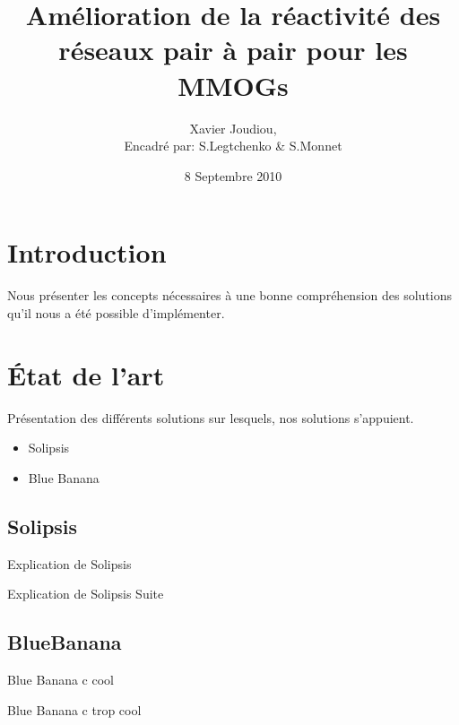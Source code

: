 \documentclass{beamer}
\title{Amélioration de la réactivité des réseaux pair à pair pour les MMOGs}
\author{Xavier Joudiou,\\\tiny{Encadré par: S.Legtchenko \& S.Monnet}}\institute{Université Paris VI, Master SAR}
\date{8 Septembre 2010}
\begin{document}
  \begin{frame}
  \maketitle
  \end{frame}


  \begin{frame}
  \tableofcontents
  \end{frame}

  \section{Introduction}
  \begin{frame}
	Nous présenter les concepts nécessaires à une bonne compréhension des solutions qu'il nous a été possible d'implémenter.
  \end{frame}
	
  \section{État de l'art}
  \begin{frame}
	Présentation des différents solutions sur lesquels, nos solutions s'appuient.
	\begin{itemize}
		\item Solipsis
		\item Blue Banana
	\end{itemize}
  \end{frame}

  \subsection{Solipsis}
  \begin{frame}
	Explication de Solipsis
  \end{frame}

  \begin{frame}
	Explication de Solipsis Suite
  \end{frame}

  \subsection{BlueBanana}
  \begin{frame}
	Blue Banana c cool
  \end{frame}

  \begin{frame}
	Blue Banana c trop cool
  \end{frame}
\end{document}
